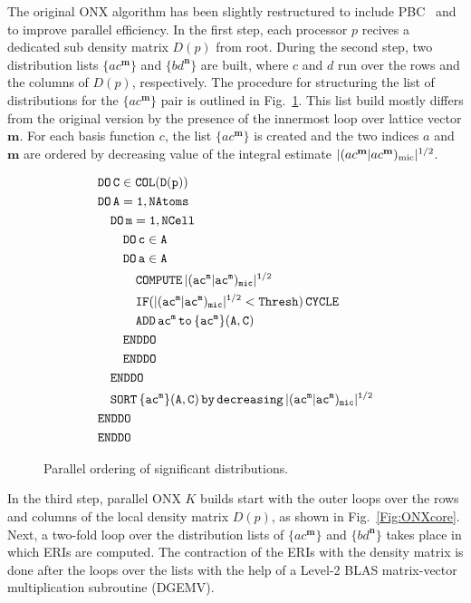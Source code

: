 \documentclass[prl,twocolumn,showpacs,twocolumngrid,superbib]{revtex4}
\begin{document}
The original ONX algorithm has been slightly restructured 
to include PBC~\cite{CTymczak04b} and to improve parallel efficiency.
In the first step, each processor $p$ recives a dedicated sub density matrix $D(p)$ from root.
During the second step, two distribution lists $\{ac^\mathbf{m}\}$ and
$\{bd^\mathbf{n}\}$ are built, where $c$ and $d$ run over the rows and the
columns of $D(p)$, respectively. The procedure for structuring the list of distributions
for the $\{ac^\mathbf{m}\}$ pair is outlined in Fig.~\ref{Fig:List}.
This list build mostly differs from the original version by the presence
of the innermost loop over lattice vector $\mathbf{m}$. For
each basis function $c$, the list $\{ac^\mathbf{m}\}$ is created and the 
two indices $a$ and $\mathbf{m}$ are ordered by decreasing value 
of the integral estimate $|(ac^\mathbf{m}|ac^\mathbf{m})_{\rm mic}|^{1/2}$.

\begin{figure}[htbp]
  \centering
  \caption{\protect
    Parallel ordering of significant distributions.
  }\label{Fig:List}
  \begin{equation*}
    \begin{split}
      &\tt          DO\,C\in COL(D(p))\\
      &\tt          DO\,A=1,NAtoms\\
      &\tt\quad       DO\,m=1,NCell\\
      &\tt\qquad        DO\,c\in A\\
      &\tt\qquad        DO\,a\in A\\
      &\tt\qquad\quad     COMPUTE\,|(ac^m|ac^m)_{mic}|^{1/2}\\
      &\tt\qquad\quad     IF(|(ac^m|ac^m)_{mic}|^{1/2}<{\tt Thresh)\,CYCLE}\\
      &\tt\qquad\quad     ADD\,ac^m\,{\tt to}\, \{ac^m\}(A,C)\\
      &\tt\qquad        ENDDO\\
      &\tt\qquad        ENDDO\\
      &\tt\quad       ENDDO\\
      &\tt\quad       SORT\,\{ac^m\}(A,C)\,by\,decreasing\,|(ac^m|ac^m)_{mic}|^{1/2}\\
      &\tt         ENDDO\\
      &\tt         ENDDO
    \end{split}
  \end{equation*}
\end{figure}

In the third step, parallel ONX $K$ builds start with the outer loops over
the rows and columns of the local density matrix $D(p)$, 
as shown in Fig.~\ref{Fig:ONXcore}. Next, a two-fold loop over
the distribution lists of $\{ac^\mathbf{m}\}$ and $\{bd^\mathbf{n}\}$
takes place in which ERIs are computed. The contraction of 
the ERIs with the density matrix is done after the loops over the lists with the help of a 
Level-2 BLAS matrix-vector multiplication subroutine (DGEMV).
\end{document}
